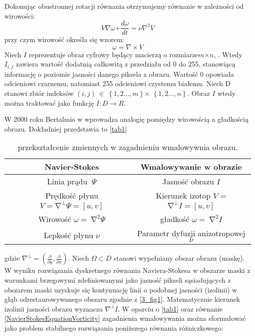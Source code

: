 \documentclass[12pt, twoside, openany]{report}
\theoremstyle{definition}
\begin{document}
Dokonując obustronnej rotacji równania \cite{StreamfuntionVorticityForm} otrzymujemy równanie w zależności od wirowości:
\begin{equation}
V\nabla \omega \mathrm{+}\frac{d\omega }{dt}\mathrm{=}\nu {\nabla }^{\mathrm{2}}V
\label{NavierStokesEquationVorticity}
\end{equation}
przy czym wirowość określa się wzorem:
\begin{equation}
\omega =\nabla \times V
\label{Vorticity}
\end{equation}
Niech $I$ reprezentuje obraz cyfrowy będący macierzą o rozmiarze$m \mathrm{\times} n$, \cite{ebrahimi2012navier}. Wtedy $I_{i,j}$ zawiera wartość dodatnią całkowitą z przedziału od 0 do 255, stanowiącą informację o poziomie jasności danego piksela z obrazu. Wartość 0 opowiada odcieniowi czarnemu, natomiast 255 odcieniowi czystemu białemu. Niech D stanowi zbiór indeksów $(i,j)\ \in \ \left\{1,2\dots ,m\right\} \mathrm{\times}$ $\left\{1,2\dots ,n\right\}$. Obraz $I$ wtedy można traktować jako funkcję $I:D\to R$.
\par
W 2000 roku Bertalmio w \cite{BertalmioNavierStokes} wprowadza analogię pomiędzy wirowością a gładkością obrazu. Dokładniej przedstawia to \autoref{tab1}
\begin{table}[!h]
	\centering
	\begin{tabular}{|cc|c|}
	\hline \hline

		& Navier-Stokes
		& Wmalowywanie w obrazie\\ \hline
		
		& Linia prądu $\ \mathit{\Psi}$ &  Jasność obrazu $I$ \\ \hline
	
		& Prędkość płynu $V = {\mathrm{\nabla }}^{\bot }\mathit{\Psi} = [u, v]$  & Kierunek izotop $V$ = ${\mathrm{\nabla }}^{\bot }I = [u, v]$ \\ \hline
		& Wirowość $\omega =\ {\mathrm{\nabla }}^2\mathit{\Psi}$ & gładkość $\omega =\ {\mathrm{\nabla }}^2I$ \\ \hline
		
		& Lepkość płynu $\nu $ & Parametr dyfuzji anizotropowej $\nu $ \\
	\hline
	\end{tabular}
	\caption{przekształcenie zmiennych w zagadnieniu wmalowywnia obrazu.}
	\label{tab1}
\end{table}
gdzie ${\nabla }^{\bot }=(\frac{\partial }{\partial y},\frac{\partial }{\partial x})$.
Niech $\mathit{\Omega}\subset D$ stanowi wypełniany obszar obrazu (maskę). W wyniku rozwiązania dyskretnego równania Naviera-Stokesa w obszarze maski z warunkami brzegowymi zdefiniowanymi jako jasność pikseli sąsiadujących z obszarem maski uzyskuje się kontynuację linii o podobnej jasności (izolinii) w głąb odrestaurowywanego obszaru zgodnie z \autoref{3_fig1}.  Matematycznie kierunek izolinii jasności obrazu wyznacza ${\nabla }^{\bot }I$. W oparciu o \autoref{tab1} oraz równanie  \eqref{NavierStokesEquationVorticity} zagadnienia wmalowywania można sformułować jako problem stabilnego rozwiązania poniższego równania różniczkowego:
\end{document}
